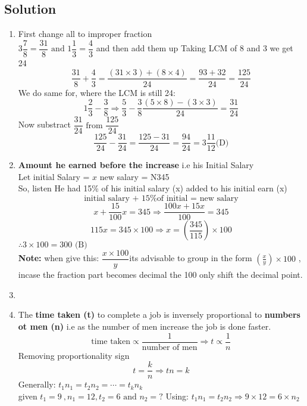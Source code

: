 \subsection{Solution}
\begin{multicols}{2}
\begin{enumerate}[label={\arabic*.}]
    \item First change all to improper fraction \\
    \(3\dfrac{7}{8} = \dfrac{31}{8} \text { and } 1\dfrac{1}{3} = \dfrac{4}{3}\) and then add them up 
    Taking LCM of 8 and 3 we get 24
    \[\frac{31}{8} + \frac{4}{3} = \frac{(31 \times 3) + (8 \times 4) }{24} = \frac{93 + 32}{24} = \dfrac{125}{24} \]
    We do same for, where the LCM is still 24: 
    \[1\frac{2}{3} - \frac{3}{8} \Rightarrow \frac{5}{3} - \frac{3}{8}  \frac{(5 \times 8) - (3 \times 3)}{24} = \frac{31}{24}\]
    Now substract \(\dfrac{31}{24} \text { from } \dfrac{125}{24}\)
    \[\frac{125}{24} - \frac{31}{24} = \frac{125 - 31}{24} = \frac{94}{24} = 3\frac{11}{12} \text{(D)} \]
    \item \textbf{Amount he earned before the increase} i.e his Initial Salary \\
    Let initial Salary = \(x\) \hspace {10px}  new salary = N345\\
    So, listen He had 15\% of his initial salary (x) added to his initial earn (x)
    \[\text{initial salary + 15\% of initial = new salary}\]
    \[x + \dfrac{15}{100}x = 345 \Rightarrow \dfrac{100x + 15x}{100} = 345\]
    \[115x = 345 \times 100 \Rightarrow x = \left(\frac{345}{115}\right) \times 100\]
    \(\therefore 3 \times 100 = 300 \text{ (B)}\)\\
    \textbf{Note:} when give this: \( \dfrac{x \times 100}{y}\)its advisable to group in the form
    \(\left(\frac{x}{y}\right) \times 100\) , incase the fraction part becomes decimal the 100 only shift the
    decimal point. 

    \item
    \item The \textbf{time taken (t)} to complete a job is inversely proportional to \textbf{numbers ot men (n)} 
    i.e as the number of men increase the job is done faster. 
    \begin{equation}
        \text{time taken} \propto \dfrac{1}{\text{number of men}} \Rightarrow t \propto \dfrac{1}{n}
    \end {equation}
    Removing proportionality sign
    \[t = \dfrac{k}{n} \Rightarrow tn = k\]
    Generally: \(t_{1}n_{1} = t_{2}n_2 = \cdots = t_{k}n_{k}\)\\
    given \(t_{1} = 9\ , n_{1} = 12 , t_{2} = 6 \text{ and } n_{2} = ?\)
    Using: \(t_{1}n_{1} = t_{2}n_{2} \Rightarrow 9 \times 12 = 6 \times n_{2}\) 


\end{enumerate}
\end{multicols}

